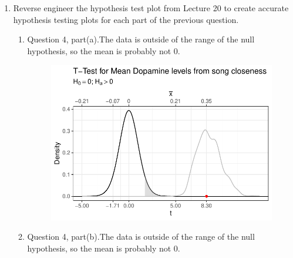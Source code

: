 \documentclass{article}\usepackage[]{graphicx}\usepackage[]{xcolor}
\makeatletter
\def\maxwidth{ %
  \ifdim\Gin@nat@width>\linewidth
    \linewidth
  \else
    \Gin@nat@width
  \fi
}
\newenvironment{knitrout}{}{} %
\makeatother
\begin{document}
\begin{enumerate}
\begin{enumerate}
\end{enumerate}
\item Reverse engineer the hypothesis test plot from Lecture 20 to create accurate
hypothesis testing plots for each part of the previous question.


\begin{enumerate}
  \item Question 4, part(a).The data is outside of the range of the null hypothesis, so the mean is probably not 0. 

\begin{figure}[H]
\begin{center}
\begin{knitrout}
\color{fgcolor}
\includegraphics[width=\maxwidth]{figure/unnamed-chunk-9-1} 
\end{knitrout}
\label{plot2} 
\end{center}
\end{figure}

  \item Question 4, part(b).The data is outside of the range of the null hypothesis, so the mean is probably not 0. 


\end{enumerate}
\end{enumerate}
\end{document}
